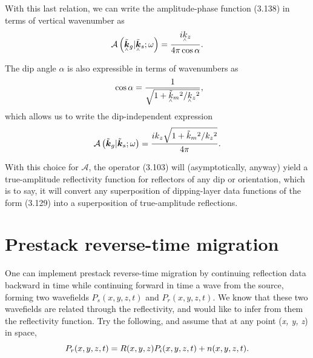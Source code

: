 With this last relation, we can write the amplitude-phase function (3.138) in terms of vertical wavenumber as
\begin{equation} \mathcal{A}\left(\underset{{}^{\wedge}}{\tilde{\boldsymbol{k}}}{}_g|
\underset{{}^{\wedge}}{\tilde{\boldsymbol{k}}}{}_s;\omega \right) =\frac{ i{\text{\textit{$\underset{{}^{\wedge}}{\text{\textit{$k$}}}$}}}{}_{\text{\textit{$z$}}}}{4\pi
 \cos  \alpha \text{\textit{$ $}}}.\end{equation}

The dip angle $\alpha $ is also expressible in terms of wavenumbers as
\begin{equation}\text{  }\cos  \alpha \text{\textit{$ $}}=\frac{1}{ \sqrt{1+\text{\textit{$\underset{{}^{\wedge}}{\tilde{k}}{}_m$}}{}^2/\text{\textit{$\underset{{}^{\wedge}}{k}{}_z$}}{}^2}},\end{equation}
which allows us to write the dip-independent expression
\begin{equation} \mathcal{A}\left(\tilde{\boldsymbol{k}}_{\text{\textit{$g$}}}|\tilde{\boldsymbol{k}}_{\text{\textit{$s$}}};\omega \right) =\frac{ i\text{\textit{$k$}}_{\text{\textit{$z$}}} \sqrt{1+\text{\textit{$\tilde{k}_m$}}{}^2/\text{\textit{$k_z$}}{}^2}}{4\pi
}.\end{equation}

With this choice for $\mathcal{A}$, the operator (3.103) will (asymptotically, anyway) yield a true-amplitude reflectivity function for reflectors
of any dip or orientation, which is to say, it will convert any superposition of dipping-layer data functions of the form (3.129) into a superposition
of true-amplitude reflections.

\section{Prestack reverse-time migration}

One can implement prestack reverse-time migration by continuing reflection data backward in time while continuing forward in time a wave from the
source, forming two wavefields \(P_s(x,y,z,t)\) and \(P_r(x,y,z,t)\). We know that these two wavefields are related through the reflectivity,
and would like to infer from them the reflectivity function. Try the following, and assume that at any point (\textit{x, y, z}) in space,
\begin{equation}\text{\textit{$P_r(x,y,z,t)$}}\text{\textit{$ $}}=\text{\textit{$ $}}\text{\textit{$R$}}\text{\textit{$(x,y,z)$}} \text{\textit{$P_i$}}\text{\textit{$(x,y,z,t)$}}\text{\textit{$
$}}+\text{\textit{$n(x,y,z,t).$}}\end{equation}

